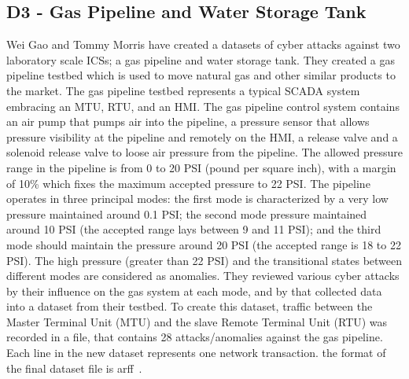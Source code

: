 \documentclass[english,12pt]{article}
\begin{document}



\subsection{D3 - Gas Pipeline and Water Storage Tank} \label{Gas Pipeline and Water Storage Tank}

Wei Gao and Tommy Morris have created a datasets of cyber attacks against two laboratory scale ICSs;
a gas pipeline and water storage tank. They created a gas pipeline testbed which is used to move natural gas and other similar products to the market. 
The gas pipeline testbed represents a typical SCADA system embracing an MTU, RTU, and an HMI. The gas pipeline control system contains an air pump that pumps air
into the pipeline, a pressure sensor that allows pressure visibility at the pipeline and remotely on the HMI, a release valve and a solenoid release
valve to loose air pressure from the pipeline. The allowed pressure range in the pipeline is from 0 to 20 PSI (pound per square inch), with a margin
of 10\% which fixes the maximum accepted pressure to 22 PSI. The pipeline operates in three principal modes: the first mode is characterized by a very
low pressure maintained around 0.1 PSI; the second mode pressure maintained around 10 PSI (the accepted range lays between 9 and 11 PSI); and the third mode
should maintain the pressure around 20 PSI (the accepted range is 18 to 22 PSI). The high pressure (greater than 22 PSI) and the transitional states
between different modes are considered as anomalies.
They reviewed various cyber attacks by their influence on the gas system at each mode, and by that collected data into a dataset from their testbed.
To create this dataset, traffic between the Master Terminal Unit (MTU) and the slave Remote Terminal Unit (RTU) was recorded in a file, that contains
28 attacks/anomalies against the gas pipeline.
Each line in the new dataset represents one network transaction.
the format of the final dataset file is arff~\cite{DBLP:journals/tii/NaderHB14}.
\end{document}
